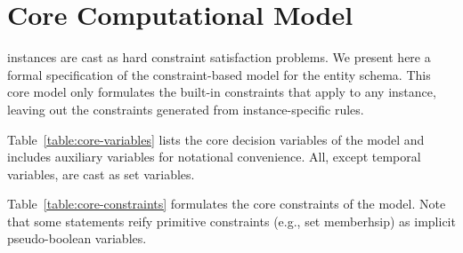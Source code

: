 \section{Core Computational Model}
\label{appendix:core-model}
\UTP{} instances are cast as hard constraint satisfaction problems.
We present here a formal specification of the constraint-based model for the entity schema.
This core model only formulates the built-in constraints %
that apply to any instance,
leaving out the constraints generated from instance-specific rules.

Table~\ref{table:core-variables} lists the core decision variables of the model
and includes auxiliary variables for notational convenience.
All, except temporal variables, are cast as set variables. 





Table~\ref{table:core-constraints} formulates the core constraints of the model.
Note that some statements reify primitive constraints (e.g., set memberhsip) as implicit pseudo-boolean variables. 

